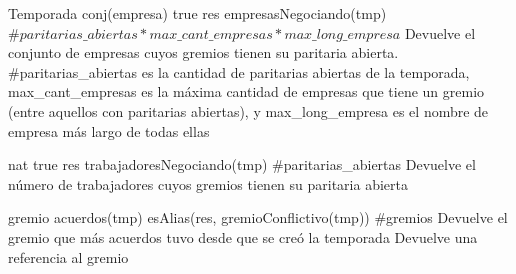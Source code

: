 \begin{interfaz}{Temporada}
{}{conj(empresa)}
{true}
{res \igobs empresasNegociando(tmp)}
{\ensuremath{\#paritarias\_abiertas * max\_cant\_empresas * max\_long\_empresa }}
{Devuelve el conjunto de empresas cuyos gremios tienen su paritaria abierta. \\

\hspace{3pt} \#paritarias\_abiertas es la cantidad de paritarias abiertas de la temporada, max\_cant\_empresas es la m\'axima cantidad de empresas que tiene un gremio (entre aquellos con paritarias abiertas), y max\_long\_empresa es el nombre de empresa m\'as largo de todas ellas}
{}

{}{nat}
{true}
{res \igobs trabajadoresNegociando(tmp)}
{\#paritarias\_abiertas}
{Devuelve el n\'umero de trabajadores cuyos gremios tienen su paritaria abierta}
{}

{}
{gremio}
{\emptyset \neq acuerdos(tmp)}
{ esAlias(res, gremioConflictivo(tmp))}
{\#gremios}
{Devuelve el gremio que m\'as acuerdos tuvo desde que se cre\'o la temporada }
{Devuelve una referencia al gremio}

\end{interfaz}